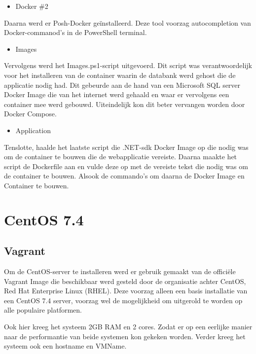 \begin{itemize}[noitemsep]
	\item Docker \#2
\end{itemize}

Daarna werd er Posh-Docker geïnstalleerd. Deze tool voorzag autocompletion van Docker-commanod's in de PowerShell terminal.

\begin{itemize}[noitemsep]
	\item Images
\end{itemize}

Vervolgens werd het Images.ps1-script uitgevoerd. Dit script was verantwoordelijk voor het installeren van de container waarin de databank werd gehost die de applicatie nodig had. Dit gebeurde aan de hand van een Microsoft SQL server Docker Image die van het internet werd gehaald en waar er vervolgens een container mee werd gebouwd. Uiteindelijk kon dit beter vervangen worden door Docker Compose.

\begin{itemize}[noitemsep]
	\item Application
\end{itemize}

Tenslotte, haalde het laatste script die .NET-sdk Docker Image op die nodig was om de container te bouwen die de webapplicatie vereiste. Daarna maakte het script de Dockerfile aan en vulde deze op met de vereiste tekst die nodig was om de container te bouwen.
Alsook de commando's om daarna de Docker Image en Container te bouwen.

\section{CentOS 7.4}

\subsection{Vagrant}
Om de CentOS-server te installeren werd er gebruik gemaakt van de officiële Vagrant Image die beschikbaar werd gesteld door de organisatie achter CentOS, Red Hat Enterprise Linux (RHEL). Deze voorzag alleen een basis installatie van een CentOS 7.4 server, voorzag wel de mogelijkheid om uitgerold te worden op alle populaire platformen.


Ook hier kreeg het systeem 2GB RAM en 2 cores. Zodat er op een eerlijke manier naar de performantie van beide systemen kon gekeken worden. Verder kreeg het systeem ook een hostname en VMName.

